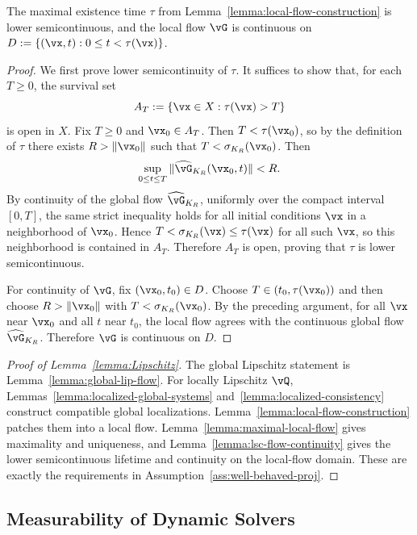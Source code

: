 \begin{lemma}\label{lemma:lsc-flow-continuity}
The maximal existence time $\tau$ from Lemma~\ref{lemma:local-flow-construction} is
lower semicontinuous, and the local flow $\vG$ is continuous on
$D:=\{(\vx,t):0\le t<\tau(\vx)\}$.
\end{lemma}
\begin{proof}
We first prove lower semicontinuity of $\tau$. It suffices to show that, for
each $T\ge 0$, the survival set
\[
A_T:=\{\vx\in X:\tau(\vx)>T\}
\]
is open in $X$. Fix $T\ge 0$ and $\vx_0\in A_T$. Then
$T<\tau(\vx_0)$, so by the definition of $\tau$ there exists
$R>\|\vx_0\|$ such that $T<\sigma_{K_R}(\vx_0)$. Then
\[
\sup_{0\le t\le T}\|\widehat{\vG}_{K_R}(\vx_0,t)\|<R.
\]
By continuity of the global flow $\widehat{\vG}_{K_R}$, uniformly over the
compact interval $[0,T]$, the same strict inequality holds for all initial
conditions $\vx$ in a neighborhood of $\vx_0$. Hence
$T<\sigma_{K_R}(\vx)\le \tau(\vx)$ for all such $\vx$, so this neighborhood is
contained in $A_T$. Therefore $A_T$ is open, proving that $\tau$ is lower
semicontinuous.

For continuity of $\vG$, fix $(\vx_0,t_0)\in D$. Choose
$T\in(t_0,\tau(\vx_0))$ and then choose $R>\|\vx_0\|$ with
$T<\sigma_{K_R}(\vx_0)$. By the preceding argument, for all $\vx$ near $\vx_0$
and all $t$ near $t_0$, the local flow agrees with the continuous global flow
$\widehat{\vG}_{K_R}$. Therefore $\vG$ is continuous on $D$.
\end{proof}

\lemLipschitz*
\begin{proof}[Proof of Lemma~\ref{lemma:Lipschitz}]
The global Lipschitz statement is Lemma~\ref{lemma:global-lip-flow}. For locally
Lipschitz $\vQ$, Lemmas~\ref{lemma:localized-global-systems}
and~\ref{lemma:localized-consistency} construct compatible global
localizations. Lemma~\ref{lemma:local-flow-construction} patches them into a
local flow. Lemma~\ref{lemma:maximal-local-flow} gives maximality and
uniqueness, and Lemma~\ref{lemma:lsc-flow-continuity} gives the lower
semicontinuous lifetime and continuity on the local-flow domain. These are
exactly the requirements in Assumption~\ref{ass:well-behaved-proj}.
\end{proof}

\subsection{Measurability of Dynamic Solvers}


